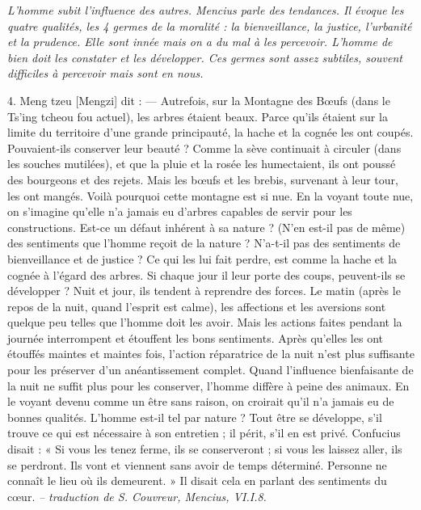 \textit{L'homme subit l'influence des autres.
Mencius parle des tendances. Il évoque les quatre qualités, les 4 germes de la moralité : la bienveillance, la justice, l'urbanité et la prudence. Elle sont innée mais on a du mal à les percevoir. L'homme de bien doit les constater et les développer. Ces germes sont assez subtiles, souvent difficiles à percevoir mais sont en nous. 
}

\begin{singlequote}
    4.	Meng tzeu [Mengzi] dit :
—	Autrefois, sur la Montagne des Bœufs (dans le Ts’ing tcheou fou actuel), les arbres étaient beaux. Parce qu’ils étaient sur la limite du territoire d’une grande principauté, la hache et la cognée les ont coupés. Pouvaient-ils conserver leur beauté ?  Comme la sève continuait à circuler (dans les souches mutilées), et que la pluie et la rosée les humectaient, ils ont poussé des bourgeons et des rejets. Mais les bœufs et les brebis, survenant à leur tour, les ont mangés. Voilà pourquoi cette montagne est si nue. En la voyant toute nue, on s’imagine qu’elle n’a jamais eu d’arbres capables de servir pour les constructions. Est-ce un défaut inhérent à sa nature ?
(N’en est-il pas de même) des sentiments que l’homme reçoit de la nature ? N’a-t-il pas des sentiments de bienveillance et de justice ? Ce qui les lui fait perdre, est comme la hache et la cognée à l’égard des arbres. Si chaque jour il leur porte des coups, peuvent-ils se développer ? Nuit et jour, ils tendent à reprendre des forces. Le matin (après le repos de la nuit, quand l’esprit est calme), les affections et les aversions sont quelque peu telles que l’homme doit les avoir. Mais les actions faites pendant la journée interrompent et étouffent les bons sentiments. Après qu’elles les ont étouffés maintes et maintes fois, l’action réparatrice de la nuit n’est plus suffisante pour les préserver d’un anéantissement complet. Quand l’influence bienfaisante de la nuit ne suffit plus pour les conserver, l’homme diffère à peine des animaux. En le voyant devenu comme un être sans raison, on croirait qu’il n’a jamais eu de bonnes qualités. L’homme est-il tel par nature ? Tout être se développe, s’il trouve ce qui est nécessaire à son entretien ; il périt, s’il en est privé. Confucius disait : « Si vous les tenez ferme, ils se conserveront ; si vous les laissez aller, ils se perdront. Ils vont et viennent sans avoir de temps déterminé. Personne ne connaît le lieu où ils demeurent. » Il disait cela en parlant des sentiments du cœur. 
 \textit{\small -- traduction de S. Couvreur, Mencius, VI.I.8.}

\end{singlequote}

